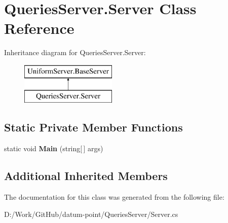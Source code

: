\hypertarget{class_queries_server_1_1_server}{}\section{Queries\+Server.\+Server Class Reference}
\label{class_queries_server_1_1_server}
Inheritance diagram for Queries\+Server.\+Server\+:\begin{figure}[H]
\begin{center}
\leavevmode
\includegraphics[height=2.000000cm]{d2/d9a/class_queries_server_1_1_server}
\end{center}
\end{figure}
\subsection*{Static Private Member Functions}
\begin{DoxyCompactItemize}
\item 
\mbox{\label{class_queries_server_1_1_server_ae294b75511557ef0701455c0e2ba785d}} 
static void {\bfseries Main} (string\mbox{[}$\,$\mbox{]} args)
\end{DoxyCompactItemize}
\subsection*{Additional Inherited Members}


The documentation for this class was generated from the following file\+:\begin{DoxyCompactItemize}
\item 
D\+:/\+Work/\+Git\+Hub/datum-\/point/\+Queries\+Server/Server.\+cs\end{DoxyCompactItemize}
